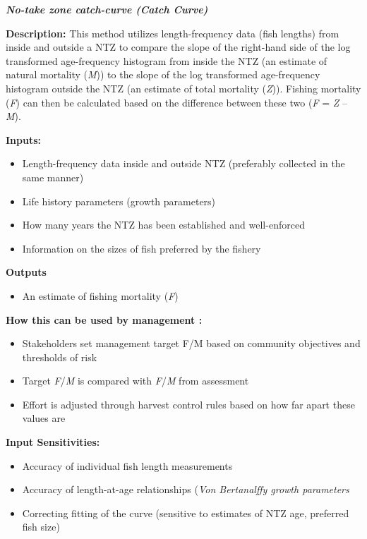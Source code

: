 \documentclass[]{book}
\providecommand{\tightlist}{%
  \setlength{\itemsep}{0pt}\setlength{\parskip}{0pt}}
\begin{document}
\textbf{\emph{No-take zone catch-curve (Catch Curve)}}

\textbf{Description:} This method utilizes length-frequency data (fish
lengths) from inside and outside a NTZ to compare the slope of the
right-hand side of the log transformed age-frequency histogram from
inside the NTZ (an estimate of natural mortality (\emph{M})) to the
slope of the log transformed age-frequency histogram outside the NTZ (an
estimate of total mortality (\emph{Z})). Fishing mortality (\emph{F})
can then be calculated based on the difference between these two
(\emph{F} = \emph{Z} -- \emph{M}).

\textbf{Inputs:}

\begin{itemize}
\item
  Length-frequency data inside and outside NTZ (preferably collected in
  the same manner)
\item
  Life history parameters (growth parameters)
\item
  How many years the NTZ has been established and well-enforced
\item
  Information on the sizes of fish preferred by the fishery
\end{itemize}

\textbf{Outputs}

\begin{itemize}
\tightlist
\item
  An estimate of fishing mortality (\emph{F})
\end{itemize}

\textbf{How this can be used by management :}

\begin{itemize}
\item
  Stakeholders set management target F/M based on community objectives
  and thresholds of risk
\item
  Target \emph{F}/\emph{M} is compared with \emph{F}/\emph{M} from
  assessment
\item
  Effort is adjusted through harvest control rules based on how far
  apart these values are
\end{itemize}

\textbf{Input Sensitivities: }

\begin{itemize}
\item
  Accuracy of individual fish length measurements
\item
  Accuracy of length-at-age relationships (\emph{Von Bertanalffy growth
  parameters}
\item
  Correcting fitting of the curve (sensitive to estimates of NTZ age,
  preferred fish size)
\end{itemize}
\end{document}
